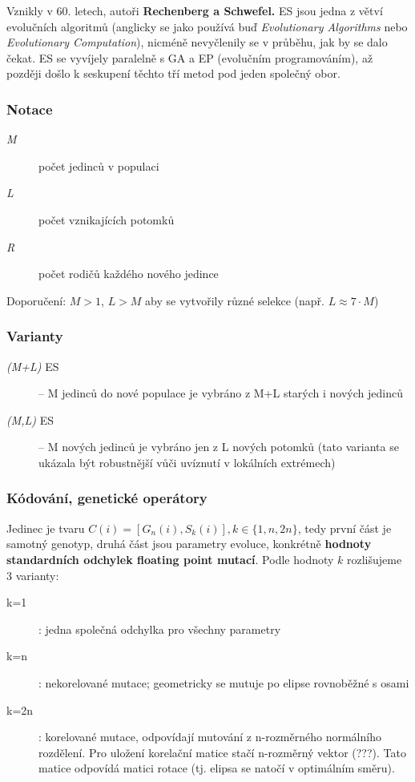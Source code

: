 Vznikly v 60. letech, autoři \textbf{Rechenberg a Schwefel.} ES jsou jedna z větví evolučních algoritmů (anglicky se jako  používá buď \textit{Evolutionary Algorithms} nebo \textit{Evolutionary Computation}), nicméně nevyčlenily se v průběhu, jak by se dalo čekat. ES se vyvíjely paralelně s GA a EP (evolučním programováním), až později došlo k seskupení těchto tří metod pod jeden společný obor.

\subsubsection{Notace}
\begin{description}
	
	
	\item[\textit{M}] počet jedinců v populaci
	\item[\textit{L}] počet vznikajících potomků
	\item[\textit{R}] počet rodičů každého nového jedince
\end{description}
Doporučení: $M > 1$, $L > M$ aby se vytvořily různé selekce (např. $L \approx 7 \cdot M$)

\subsubsection{Varianty}
\begin{description}
	
	
	\item[\textit{(M+L)} ES] -- M jedinců do nové populace je vybráno z M+L starých i nových jedinců
	\item[\textit{(M,L)} ES] -- M nových jedinců je vybráno jen z L nových potomků (tato varianta se ukázala být robustnější vůči uvíznutí v lokálních extrémech)
\end{description}

\subsubsection{Kódování, genetické operátory}
Jedinec je tvaru $C(i) = [G_n(i), S_k(i)], k \in \{1, n, 2n\}$, tedy první část je samotný genotyp, druhá část jsou parametry evoluce, konkrétně \textbf{hodnoty standardních odchylek floating point mutací}. Podle hodnoty $k$ rozlišujeme 3 varianty:
\begin{description}
	
	
	\item[k=1]: jedna společná odchylka pro všechny parametry
	\item[k=n]: nekorelované mutace; geometricky se mutuje po elipse rovnoběžné s osami
	\item[k=2n]: korelované mutace, odpovídají mutování z n-rozměrného normálního rozdělení. 
	Pro uložení korelační matice stačí n-rozměrný vektor (???). Tato matice odpovídá matici rotace (tj. elipsa se natočí v optimálním směru).
\end{description}

